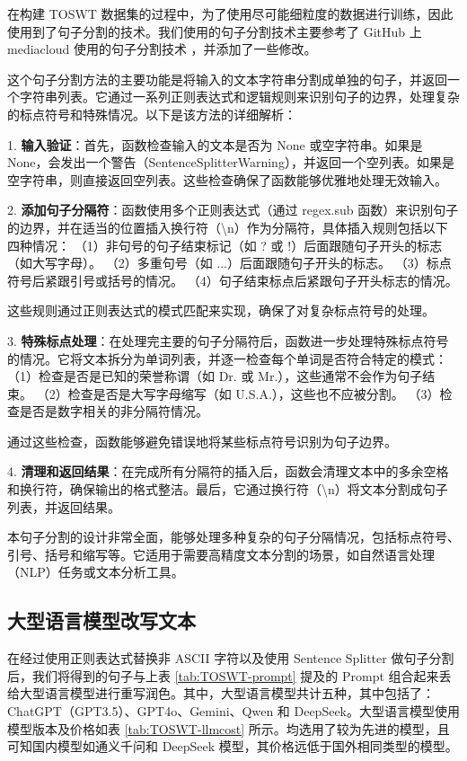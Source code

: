 在构建 TOSWT 数据集的过程中，为了使用尽可能细粒度的数据进行训练，因此使用到了句子分割的技术。我们使用的句子分割技术主要参考了 GitHub 上 mediacloud 使用的句子分割技术 \cite{sentence-splitter}，并添加了一些修改。

这个句子分割方法的主要功能是将输入的文本字符串分割成单独的句子，并返回一个字符串列表。它通过一系列正则表达式和逻辑规则来识别句子的边界，处理复杂的标点符号和特殊情况。以下是该方法的详细解析：

1. \textbf{输入验证}：首先，函数检查输入的文本是否为 None 或空字符串。如果是 None，会发出一个警告（SentenceSplitterWarning），并返回一个空列表。如果是空字符串，则直接返回空列表。这些检查确保了函数能够优雅地处理无效输入。

2. \textbf{添加句子分隔符}：函数使用多个正则表达式（通过 regex.sub 函数）来识别句子的边界，并在适当的位置插入换行符（\textbackslash{}n）作为分隔符，具体插入规则包括以下四种情况：
（1）非句号的句子结束标记（如 ? 或 !）后面跟随句子开头的标志（如大写字母）。
（2）多重句号（如 ...）后面跟随句子开头的标志。
（3）标点符号后紧跟引号或括号的情况。
（4）句子结束标点后紧跟句子开头标志的情况。

这些规则通过正则表达式的模式匹配来实现，确保了对复杂标点符号的处理。

3. \textbf{特殊标点处理}：在处理完主要的句子分隔符后，函数进一步处理特殊标点符号的情况。它将文本拆分为单词列表，并逐一检查每个单词是否符合特定的模式：
（1）检查是否是已知的荣誉称谓（如 Dr. 或 Mr.），这些通常不会作为句子结束。
（2）检查是否是大写字母缩写（如 U.S.A.），这些也不应被分割。
（3）检查是否是数字相关的非分隔符情况。

通过这些检查，函数能够避免错误地将某些标点符号识别为句子边界。

4. \textbf{清理和返回结果}：在完成所有分隔符的插入后，函数会清理文本中的多余空格和换行符，确保输出的格式整洁。最后，它通过换行符（\textbackslash{}n）将文本分割成句子列表，并返回结果。

本句子分割的设计非常全面，能够处理多种复杂的句子分隔情况，包括标点符号、引号、括号和缩写等。它适用于需要高精度文本分割的场景，如自然语言处理（NLP）任务或文本分析工具。

\subsection{大型语言模型改写文本}
\label{sec:TOSWT-gen-llm}

在经过使用正则表达式替换非 ASCII 字符以及使用 Sentence Splitter 做句子分割后，我们将得到的句子与上表 \ref{tab:TOSWT-prompt} 提及的 Prompt 组合起来丢给大型语言模型进行重写润色。其中，大型语言模型共计五种，其中包括了：ChatGPT（GPT3.5）、GPT4o、Gemini、Qwen 和 DeepSeek。大型语言模型使用模型版本及价格如表 \ref{tab:TOSWT-llmcost} 所示。均选用了较为先进的模型，且可知国内模型如通义千问和 DeepSeek 模型，其价格远低于国外相同类型的模型。

